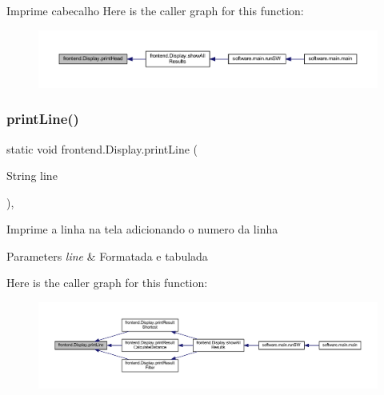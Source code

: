 Imprime cabecalho Here is the caller graph for this function\+:\nopagebreak
\begin{figure}[H]
\begin{center}
\leavevmode
\includegraphics[width=350pt]{classfrontend_1_1_display_a6704fd4ef43902afcf1bd072acc5dc71_icgraph}
\end{center}
\end{figure}
\mbox{\label{classfrontend_1_1_display_a193f8320f4b5d03906180bed773b8f52}} 
\subsubsection{\texorpdfstring{print\+Line()}{printLine()}}
{\footnotesize\ttfamily static void frontend.\+Display.\+print\+Line (\begin{DoxyParamCaption}\item[{String}]{line }\end{DoxyParamCaption})\hspace{0.3cm}{\ttfamily [static]}, {\ttfamily [private]}}

Imprime a linha na tela adicionando o numero da linha


\begin{DoxyParams}{Parameters}
{\em line} & Formatada e tabulada \\
\hline
\end{DoxyParams}
Here is the caller graph for this function\+:\nopagebreak
\begin{figure}[H]
\begin{center}
\leavevmode
\includegraphics[width=350pt]{classfrontend_1_1_display_a193f8320f4b5d03906180bed773b8f52_icgraph}
\end{center}
\end{figure}
\mbox{\label{classfrontend_1_1_display_a891f43b99b7c9ff439b8eb0544774f48}} 
